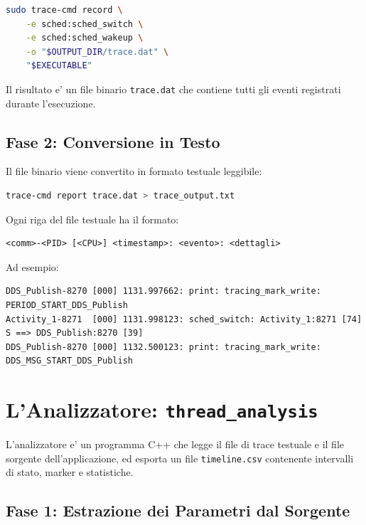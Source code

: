 \begin{lstlisting}[language=bash, caption={Comando di acquisizione.}, label={lst:tracecmd}]
sudo trace-cmd record \
    -e sched:sched_switch \
    -e sched:sched_wakeup \
    -o "$OUTPUT_DIR/trace.dat" \
    "$EXECUTABLE"
\end{lstlisting}

Il risultato e' un file binario \texttt{trace.dat} che contiene tutti
gli eventi registrati durante l'esecuzione.

\subsection{Fase 2: Conversione in Testo}
\label{subsec:report}

Il file binario viene convertito in formato testuale leggibile:

\begin{lstlisting}[language=bash]
trace-cmd report trace.dat > trace_output.txt
\end{lstlisting}

Ogni riga del file testuale ha il formato:
\begin{verbatim}
<comm>-<PID> [<CPU>] <timestamp>: <evento>: <dettagli>
\end{verbatim}

Ad esempio:
\begin{verbatim}
DDS_Publish-8270 [000] 1131.997662: print: tracing_mark_write: PERIOD_START_DDS_Publish
Activity_1-8271  [000] 1131.998123: sched_switch: Activity_1:8271 [74] S ==> DDS_Publish:8270 [39]
DDS_Publish-8270 [000] 1132.500123: print: tracing_mark_write: DDS_MSG_START_DDS_Publish
\end{verbatim}


\section{L'Analizzatore: \texttt{thread\_analysis}}
\label{sec:thread_analysis}

L'analizzatore e' un programma C++ che legge il file di trace testuale
e il file sorgente dell'applicazione, ed esporta un file
\texttt{timeline.csv} contenente intervalli di stato, marker e statistiche.

\subsection{Fase 1: Estrazione dei Parametri dal Sorgente}
\label{subsec:source_parsing}

